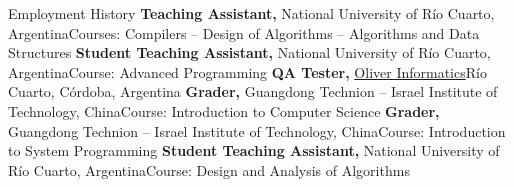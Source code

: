 \begin{rubric}{Employment History}
	\textbf{Teaching Assistant,} National University of Río Cuarto, Argentina\newline Courses: Compilers -- Design of Algorithms -- Algorithms and Data Structures
	\textbf{Student Teaching Assistant, } National University of Río Cuarto, Argentina\newline Course: Advanced Programming
	\textbf{QA Tester, } \href{https://www.oliverinformatica.com/}{Oliver Informatics}\newline Río Cuarto, Córdoba, Argentina
	\textbf{Grader, } Guangdong Technion – Israel Institute of Technology, China\newline Course: Introduction to Computer Science
	\textbf{Grader, } Guangdong Technion – Israel Institute of Technology, China\newline Course: Introduction to System Programming
	\textbf{Student Teaching Assistant, } National University of Río Cuarto, Argentina\newline Course: Design and Analysis of Algorithms
\end{rubric}